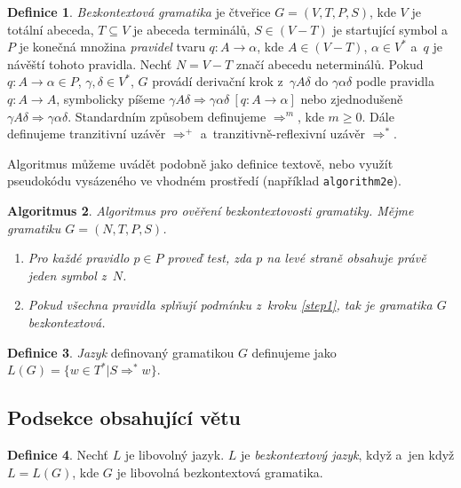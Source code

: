 \documentclass[11pt,twocolumn,a4paper]{article}
\theoremstyle{definition}
\newtheorem{mydef}{Definice}[section]
\theoremstyle{plain}
\newtheorem{myalg}[mydef]{Algoritmus}
\begin{document}
\theoremstyle{definition} 
\begin{mydef} \label{def1} 
{\textit{Bezkontextová gramatika}} je čtveřice $G = (V,T,P,S)$, kde $V$ je totální abeceda,
$T\subseteq V$ je abeceda terminálů, $S\in (V-T)$ je startující symbol a~$P$ je konečná množina \textit{pravidel} 
tvaru $q\colon A\rightarrow \alpha$, kde $A\in (V-T)$, $\alpha\in V^*$ a~$q$ je návěští tohoto pravi\-dla. Nechť $N=V-T$ značí abecedu neterminálů.
Po\-kud $q\colon A\rightarrow \alpha\in P$, $\gamma,\delta\in V^*$, $G$ provádí derivační krok z~$\gamma A\delta$ do $\gamma\alpha\delta$ podle pravidla $q\colon A\rightarrow A$, sym\-bolicky píšeme 
$\gamma A\delta \Rightarrow \gamma\alpha\delta \ [q\colon A\rightarrow\alpha]$ nebo zjed\-nodušeně $\gamma A\delta \Rightarrow \gamma\alpha\delta$. Standardním způsobem definujeme $\Rightarrow^m$, kde $m\geq0$. Dále definu\-jeme tranzitivní uzávěr $\Rightarrow^+$ a~tranzitivně-reflexivní uzávěr $\Rightarrow^*$.
\end{mydef}

Algoritmus můžeme uvádět podobně jako definice textově, nebo využít pseudokódu vysázeného ve vhodném prostředí (například \texttt{algorithm2e}).

\theoremstyle{plain}
\begin{myalg}
Algoritmus pro ověření bezkontextovosti gramatiky. Mějme gramatiku $G = (N, T, P, S)$.
\begin{enumerate}
 \item Pro každé pravidlo $p\in P$ proveď test, zda $p$ na levé straně obsahuje právě jeden symbol z~$N$.\label{step1}
 \item Pokud všechna pravidla splňují podmínku z~kroku \ref{step1}, tak je gramatika $G$ bezkontextová.
\end{enumerate}
\end{myalg}

\theoremstyle{definition}
\begin{mydef}
\textit{Jazyk} definovaný gramatikou $G$ definujeme jako $L(G) = \{w\in T^*|S\Rightarrow^* w\}$.
\end{mydef}

\subsection{Podsekce obsahující větu}

\theoremstyle{definition}
\begin{mydef}
Nechť $L$ je libovolný jazyk. $L$ je \textit{bezkontextový jazyk}, když a~jen když $L = L(G)$, kde $G$ je libovolná bezkontextová gramatika.
\end{mydef}
\end{document}
